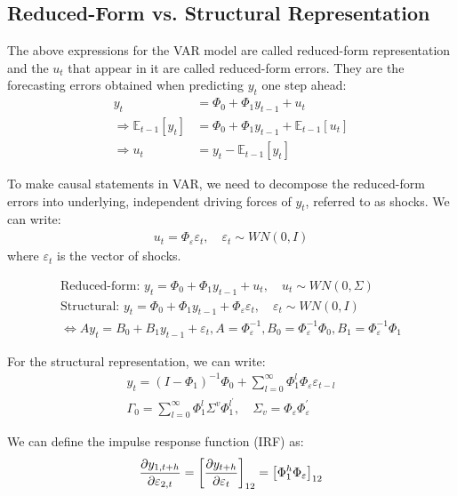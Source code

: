 \subsection{Reduced-Form vs. Structural Representation}
The above expressions for the VAR model are called reduced-form representation and the $u_t$ that appear in it are called reduced-form errors.
They are the forecasting errors obtained when predicting $y_t$ one step ahead:
\begin{align*}
    y_t &= \Phi_0 + \Phi_1 y_{t-1} + u_t \\
    \Rightarrow \mathbb{E}_{t-1} [y_t] &= \Phi_0 + \Phi_1 y_{t-1} + \mathbb{E}_{t-1} [u_t]\\
    \Rightarrow u_t &= y_t - \mathbb{E}_{t-1} [y_t]
\end{align*}

To make causal statements in VAR, we need to decompose the reduced-form errors into underlying, independent driving forces of $y_t$, referred to as shocks.
We can write:
\begin{gather*}
    u_t = \Phi_{\varepsilon} \varepsilon_t, \quad \varepsilon_t \sim WN(0, I)
\end{gather*}
where $\varepsilon_t$ is the vector of shocks.

\begin{gather*}
    \text{Reduced-form: } y_t = \Phi_0 + \Phi_1 y_{t-1} + u_t, \quad u_t \sim WN(0, \Sigma) \\
    \text{Structural: } y_t = \Phi_0 + \Phi_1 y_{t-1} + \Phi_{\varepsilon} \varepsilon_t, \quad \varepsilon_t \sim WN(0, I) \\
    \Leftrightarrow A y_t = B_0 + B_1 y_{t-1} + \varepsilon_t, A = \Phi_{\varepsilon}^{-1} , B_0 = \Phi_{\varepsilon}^{-1} \Phi_0, B_1 = \Phi_{\varepsilon}^{-1} \Phi_1
\end{gather*}


For the structural representation, we can write:
\begin{gather*}
    y_t = \left(I - \Phi_1\right)^{-1} \Phi_0 + \sum_{l=0}^{\infty} \Phi_1^l \Phi_{\varepsilon} \varepsilon_{t-l}  \\
    \Gamma_0 = \sum_{l=0}^{\infty} \Phi_1^l \Sigma^v \Phi_1^{l^\prime}, \quad \Sigma_v = \Phi_{\varepsilon} \Phi_{\varepsilon}^{\prime}
\end{gather*}

We can define the impulse response function (IRF) as:
\begin{gather}\label{eq:IRF}
    \frac{\partial y_{1, t+h}}{\partial \varepsilon_{2, t}} = \left[ \frac{\partial y_{t+h}}{\partial \varepsilon_t} \right]_{12} = \left[\Phi_1^h \Phi_{\varepsilon}\right]_{12}
\end{gather}

